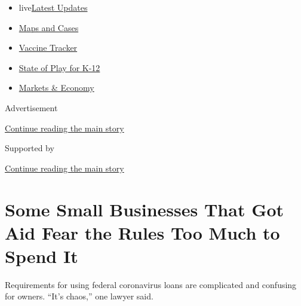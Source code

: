 \begin{itemize}
\tightlist
\item
  live\href{https://www.nytimes.com/2020/08/17/world/coronavirus-covid.html?name=styln-coronavirus-markets\&region=TOP_BANNER\&variant=undefined\&block=storyline_menu_recirc\&action=click\&pgtype=Article\&impression_id=a68b0ca0-e108-11ea-9503-53aac87edadd}{Latest
  Updates}
\item
  \href{https://www.nytimes.com/interactive/2020/us/coronavirus-us-cases.html?name=styln-coronavirus-markets\&region=TOP_BANNER\&variant=undefined\&block=storyline_menu_recirc\&action=click\&pgtype=Article\&impression_id=a68b0ca1-e108-11ea-9503-53aac87edadd}{Maps
  and Cases}
\item
  \href{https://www.nytimes.com/interactive/2020/science/coronavirus-vaccine-tracker.html?name=styln-coronavirus-markets\&region=TOP_BANNER\&variant=undefined\&block=storyline_menu_recirc\&action=click\&pgtype=Article\&impression_id=a68b0ca2-e108-11ea-9503-53aac87edadd}{Vaccine
  Tracker}
\item
  \href{https://www.nytimes.com/2020/08/17/us/k-12-schools-reopening.html?name=styln-coronavirus-markets\&region=TOP_BANNER\&variant=undefined\&block=storyline_menu_recirc\&action=click\&pgtype=Article\&impression_id=a68b0ca3-e108-11ea-9503-53aac87edadd}{State
  of Play for K-12}
\item
  \href{https://www.nytimes.com/live/2020/08/17/business/stock-market-today-coronavirus?name=styln-coronavirus-markets\&region=TOP_BANNER\&variant=undefined\&block=storyline_menu_recirc\&action=click\&pgtype=Article\&impression_id=a68b0ca4-e108-11ea-9503-53aac87edadd}{Markets
  \& Economy}
\end{itemize}

Advertisement

\protect\hyperlink{after-top}{Continue reading the main story}

Supported by

\protect\hyperlink{after-sponsor}{Continue reading the main story}

\hypertarget{some-small-businesses-that-got-aid-fear-the-rules-too-much-to-spend-it}{%
\section{Some Small Businesses That Got Aid Fear the Rules Too Much to
Spend
It}\label{some-small-businesses-that-got-aid-fear-the-rules-too-much-to-spend-it}}

Requirements for using federal coronavirus loans are complicated and
confusing for owners. ``It's chaos,'' one lawyer said.

